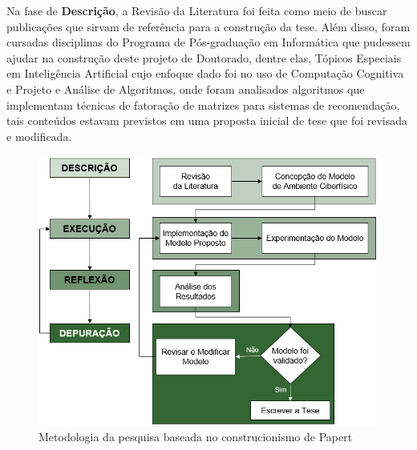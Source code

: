


Na fase de \textbf{Descrição}, a Revisão da Literatura foi feita como meio de buscar publicações que sirvam de referência para a construção da tese. Além disso, foram cursadas disciplinas do Programa de Pós-graduação em Informática que pudessem ajudar na construção deste projeto de Doutorado, dentre elas, Tópicos Especiais em Inteligência Artificial cujo enfoque dado foi no uso de Computação Cognitiva e Projeto e Análise de Algoritmos, onde foram analisados algoritmos que implementam técnicas de fatoração de matrizes para sistemas de recomendação, tais conteúdos estavam previstos em uma proposta inicial de tese que foi revisada e modificada.

\begin{figure}[ht]
	\centering
	\includegraphics[width=0.8\linewidth]{imgs/METODOLOGIA_v2.png}
	\caption{Metodologia da pesquisa baseada no construcionismo de Papert}
	\label{fig:metodologia}
\end{figure}

